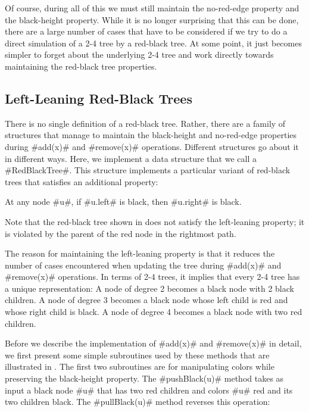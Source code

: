 Of course, during all of this we must still maintain the no-red-edge
property and the black-height property.  While it is no longer surprising
that this can be done, there are a large number of cases that have to
be considered if we try to do a direct simulation of a 2-4 tree by
a red-black tree.  At some point, it just becomes simpler to forget
about the underlying 2-4 tree and work directly towards maintaining the
red-black tree properties.

\subsection{Left-Leaning Red-Black Trees}

There is no single definition of a red-black tree.  Rather,
there are a family of structures that manage to maintain the
black-height and no-red-edge properties during #add(x)# and #remove(x)#
operations. Different structures go about it in different ways.  Here, we
implement a data structure that we call a #RedBlackTree#.  This structure
implements a particular variant of red-black trees that satisfies an
additional property:
\begin{prp}
  At any node #u#, if #u.left# is black, then #u.right# is black.
\end{prp}
Note that the red-black tree shown in   does
not satisfy the left-leaning property;  it is violated by the parent of
the red node in the rightmost path.

The reason for maintaining the left-leaning property is that it reduces
the number of cases encountered when updating the tree during #add(x)#
and #remove(x)# operations.  In terms of 2-4 trees, it implies that
every 2-4 tree has a unique representation:  A node of degree 2 becomes
a black node with 2 black children.  A node of degree 3 becomes a black
node whose left child is red and whose right child is black.  A node of
degree 4 becomes a black node with two red children.

Before we describe the implementation of #add(x)# and #remove(x)# in
detail, we first present some simple subroutines used by these methods
that are illustrated in .  The first two
subroutines are for manipulating colors while preserving the black-height
property. The #pushBlack(u)# method takes as input a black node #u#
that has two red children and colors #u# red and its two children black.
The #pullBlack(u)# method reverses this operation:

